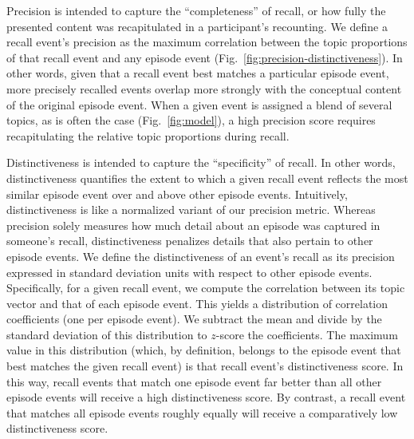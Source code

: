 \documentclass[10pt]{article}
\begin{document}
Precision is intended to capture the ``completeness'' of recall, or how fully the presented content was recapitulated in a participant's recounting.  We define a recall event's precision as the maximum correlation between the topic proportions of that recall event and any episode event (Fig.~\ref{fig:precision-distinctiveness}).  In other words, given that a recall event best matches a particular episode event, more precisely recalled events overlap more strongly with the conceptual content of the original episode event.  When a given event is assigned a blend of several topics, as is often the case (Fig.~\ref{fig:model}), a high precision score requires recapitulating the relative topic proportions during recall.

Distinctiveness is intended to capture the ``specificity'' of recall.  In other words, distinctiveness quantifies the extent to which a given recall event reflects the most similar episode event over and above other episode events.  Intuitively, distinctiveness is like a normalized variant of our precision metric.  Whereas precision solely measures how much detail about an episode was captured in someone's recall, distinctiveness penalizes details that also pertain to other episode events.  We define the distinctiveness of an event's recall as its precision expressed in standard deviation units with respect to other episode events.  Specifically, for a given recall event, we compute the correlation between its topic vector and that of each episode event.  This yields a distribution of correlation coefficients (one per episode event).  We subtract the mean and divide by the standard deviation of this distribution to $z$-score the coefficients.  The maximum value in this distribution (which, by definition, belongs to the episode event that best matches the given recall event) is that recall event's distinctiveness score.  In this way, recall events that match one episode event far better than all other episode events will receive a high distinctiveness score.  By contrast, a recall event that matches all episode events roughly equally will receive a comparatively low distinctiveness score.
\end{document}

